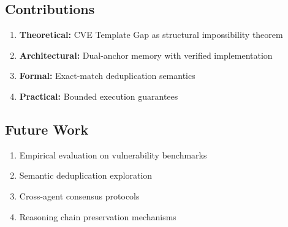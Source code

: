 \documentclass[11pt,a4paper]{article}
\theoremstyle{definition}
\begin{document}
\subsection{Contributions}

\begin{enumerate}[leftmargin=*]
    \item \textbf{Theoretical:} CVE Template Gap as structural impossibility theorem
    \item \textbf{Architectural:} Dual-anchor memory with verified implementation
    \item \textbf{Formal:} Exact-match deduplication semantics
    \item \textbf{Practical:} Bounded execution guarantees
\end{enumerate}

\subsection{Future Work}

\begin{enumerate}[leftmargin=*]
    \item Empirical evaluation on vulnerability benchmarks
    \item Semantic deduplication exploration
    \item Cross-agent consensus protocols
    \item Reasoning chain preservation mechanisms
\end{enumerate}

\end{document}

